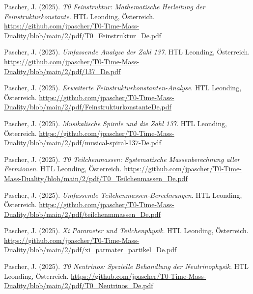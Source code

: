 \documentclass{article}
\begin{document}
\begin{thebibliography}{99}
		
		Pascher, J. (2025).
		\textit{T0 Feinstruktur: Mathematische Herleitung der Feinstrukturkonstante}.
		HTL Leonding, Österreich.
		\url{https://github.com/jpascher/T0-Time-Mass-Duality/blob/main/2/pdf/T0_Feinstruktur_De.pdf}
		
		Pascher, J. (2025).
		\textit{Umfassende Analyse der Zahl 137}.
		HTL Leonding, Österreich.
		\url{https://github.com/jpascher/T0-Time-Mass-Duality/blob/main/2/pdf/137_De.pdf}
		
		Pascher, J. (2025).
		\textit{Erweiterte Feinstrukturkonstanten-Analyse}.
		HTL Leonding, Österreich.
		\url{https://github.com/jpascher/T0-Time-Mass-Duality/blob/main/2/pdf/FeinstrukturkonstanteDe.pdf}
		
		Pascher, J. (2025).
		\textit{Musikalische Spirale und die Zahl 137}.
		HTL Leonding, Österreich.
		\url{https://github.com/jpascher/T0-Time-Mass-Duality/blob/main/2/pdf/musical-spiral-137-De.pdf}
		
		
		Pascher, J. (2025).
		\textit{T0 Teilchenmassen: Systematische Massenberechnung aller Fermionen}.
		HTL Leonding, Österreich.
		\url{https://github.com/jpascher/T0-Time-Mass-Duality/blob/main/2/pdf/T0_Teilchenmassen_De.pdf}
		
		Pascher, J. (2025).
		\textit{Umfassende Teilchenmassen-Berechnungen}.
		HTL Leonding, Österreich.
		\url{https://github.com/jpascher/T0-Time-Mass-Duality/blob/main/2/pdf/teilchenmmassen_De.pdf}
		
		Pascher, J. (2025).
		\textit{Xi Parameter und Teilchenphysik}.
		HTL Leonding, Österreich.
		\url{https://github.com/jpascher/T0-Time-Mass-Duality/blob/main/2/pdf/xi_parmater_partikel_De.pdf}
		
		
		Pascher, J. (2025).
		\textit{T0 Neutrinos: Spezielle Behandlung der Neutrinophysik}.
		HTL Leonding, Österreich.
		\url{https://github.com/jpascher/T0-Time-Mass-Duality/blob/main/2/pdf/T0_Neutrinos_De.pdf}
		

\end{thebibliography}
\end{document}
